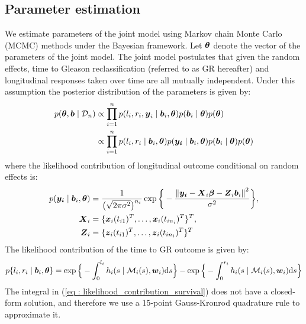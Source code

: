 \subsection{Parameter estimation}
We estimate parameters of the joint model using Markov chain Monte Carlo (MCMC) methods under the Bayesian framework. Let $\boldsymbol{\theta}$ denote the vector of the parameters of the joint model. The joint model postulates that given the random effects, time to Gleason reclassification (referred to as GR hereafter) and longitudinal responses taken over time are all mutually independent. Under this assumption the posterior distribution of the parameters is given by:
\begin{align*}
p(\boldsymbol{\theta}, \boldsymbol{b} \mid \mathcal{D}_n) & \propto \prod_{i=1}^n p(l_i, r_i, \boldsymbol{y}_i \mid \boldsymbol{b}_i, \boldsymbol{\theta}) p(\boldsymbol{b}_i \mid \boldsymbol{\theta}) p(\boldsymbol{\theta})\\
& \propto \prod_{i=1}^n p(l_i, r_i \mid \boldsymbol{b}_i, \boldsymbol{\theta}) p(\boldsymbol{y_i} \mid \boldsymbol{b}_i, \boldsymbol{\theta}) p(\boldsymbol{b}_i \mid \boldsymbol{\theta}) p(\boldsymbol{\theta})
\end{align*}
where the likelihood contribution of longitudinal outcome conditional on random effects is:
\begin{align*}
p(\boldsymbol{y_i} \mid \boldsymbol{b}_i, \boldsymbol{\theta}) &= \frac{1}{\big(\sqrt{2 \pi \sigma^2}\big)^{n_i}} \exp\bigg\{-\frac{{\lVert{\boldsymbol{y_i} - \boldsymbol{X}_i\boldsymbol{\beta} - \boldsymbol{Z}_i\boldsymbol{b}_i}\rVert}^2}{\sigma^2}\bigg\},\\
\boldsymbol{X}_i &= \{\boldsymbol{x}_i(t_{i1})^T, \ldots, \boldsymbol{x}_i(t_{in_i})^T\}^T,\\
\boldsymbol{Z}_i &= \{\boldsymbol{z}_i(t_{i1})^T, \ldots, \boldsymbol{z}_i(t_{in_i})^T\}^T
\end{align*}
The likelihood contribution of the time to GR outcome is given by:
\begin{equation}
\label{eq : likelihood_contribution_survival}
p\{l_i,r_i\mid \bmath{b}_i,\bmath{\theta}\} = \exp\Big\{-\int_0^{l_i} h_i(s \mid \mathcal{M}_i(s), \bmath{w}_i)\rmn{d}{s}\Big\} - \exp\Big\{-\int_0^{r_i}h_i(s \mid \mathcal{M}_i(s), \bmath{w}_i)\rmn{d}{s}\Big\}
\end{equation}
The integral in (\ref{eq : likelihood_contribution_survival}) does not have a closed-form solution, and therefore we use a 15-point Gauss-Kronrod quadrature rule to approximate it.

